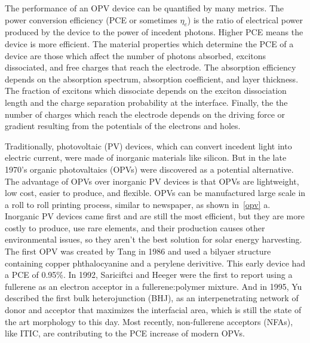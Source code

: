 The performance of an OPV device can be quantified by many metrics.
The power conversion efficiency (PCE or sometimes $\eta_{e}$) is the ratio of electrical power produced by the device to the power of incedent photons.
Higher PCE means the device is more efficient.  
The material properties which determine the PCE of a device are those which affect the number of photons absorbed, excitons dissociated, and free charges that reach the electrode.
The absorption efficiency depends on the absorption spectrum, absorption coefficient, and layer thickness.
The fraction of excitons which dissociate depends on the exciton dissociation length and the charge separation probability at the interface.
Finally, the the number of charges which reach the electrode depends on the driving force or gradient resulting from the potentials of the electrons and holes\cite{Hoppe2004}.

Traditionally, photovoltaic (PV) devices, which can convert incedent light into electric current, were made of inorganic materials like silicon.
But in the late 1970's organic photovaltaics (OPVs) were discovered as a potential alternative\cite{Tang1986b}.
The advantage of OPVs over inorganic PV devices is that OPVs are lightweight, low cost, easier to produce, and flexible. 
OPVs can be manufactured large scale in a roll to roll printing process, similar to newspaper, as shown in~\autoref{opv} a\cite{Dou2013}.
Inorganic PV devices came first and are still the most efficient, but they are more costly to produce, use rare elements, and their production causes other environmental issues, so they aren't the best solution for solar energy harvesting. 
The first OPV was created by Tang in 1986 and used a bilyaer structure containing copper phthalocyanine and a perylene derivitive\cite{Tang1986b}. 
This early device had a PCE of 0.95\%.
In 1992, Sariciftci and Heeger were the first to report using a fullerene as an electron acceptor in a fullerene:polymer mixture\cite{Sariciftci1992}.
And in 1995, Yu described the first bulk heterojunction (BHJ), as an interpenetrating network of donor and acceptor that maximizes the interfacial area, which is still the state of the art morphology to this day\cite{Yu1995}.
Most recently, non-fullerene acceptors (NFAs), like ITIC, are contributing to the PCE increase of modern OPVs\cite{S.Gurney2019b}.

